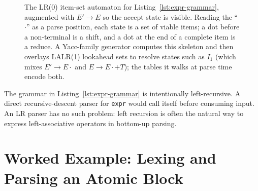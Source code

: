 \begin{figure}[ht]
\centering
{}
\caption{The LR(0) item-set automaton for Listing~\ref{lst:expr-grammar}, augmented with $E'\to E$ so the accept state is visible.  Reading the ``$\cdot$'' as a parse position, each state is a set of viable items; a dot before a non-terminal is a shift, and a dot at the end of a complete item is a reduce.  A Yacc-family generator computes this skeleton and then overlays LALR(1) lookahead sets to resolve states such as $I_1$ (which mixes $E' \to E\cdot$ and $E \to E\cdot+T$); the tables it walks at parse time encode both.}
\label{fig:lr0-automaton}
\end{figure}

The grammar in Listing~\ref{lst:expr-grammar} is intentionally left-recursive. A direct recursive-descent parser for \texttt{expr} would call itself before consuming input. An LR parser has no such problem: left recursion is often the natural way to express left-associative operators in bottom-up parsing.

\section{Worked Example: Lexing and Parsing an Atomic Block}
\label{sec:parser-example}

